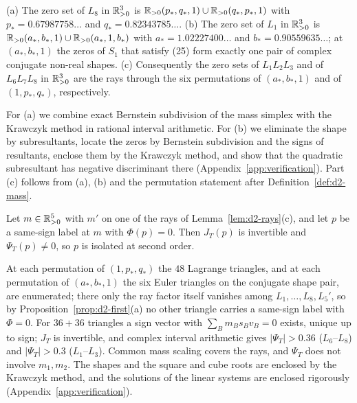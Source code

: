 \begin{lemma}\label{lem:d2-rays}
\textup{(a)} The zero set of $L_8$ in $\mathbb{R}_{>0}^3$ is $\mathbb{R}_{>0}(p_*,q_*,1)\cup\mathbb{R}_{>0}(q_*,p_*,1)$ with
$p_*=0.67987758\ldots$ and $q_*=0.82343785\ldots$.
\textup{(b)} The zero set of $L_1$ in $\mathbb{R}_{>0}^3$ is $\mathbb{R}_{>0}(a_*,b_*,1)\cup\mathbb{R}_{>0}(a_*,1,b_*)$ with
$a_*=1.02227400\ldots$ and $b_*=0.90559635\ldots$; at $(a_*,b_*,1)$ the zeros of $S_1$ that
satisfy \textup{(25)} form exactly one pair of complex conjugate non-real shapes.
\textup{(c)} Consequently the zero sets of $L_1L_2L_3$ and of $L_6L_7L_8$ in $\mathbb{R}_{>0}^3$ are the rays
through the six permutations of $(a_*,b_*,1)$ and of $(1,p_*,q_*)$, respectively.
\end{lemma}
For (a) we combine exact Bernstein subdivision of the mass simplex with the Krawczyk method in
rational interval arithmetic.  For (b) we eliminate the shape by subresultants, locate the zeros
by Bernstein subdivision and the signs of resultants, enclose them by the Krawczyk method, and
show that the quadratic subresultant has negative discriminant there
(Appendix~\ref{app:verification}).  Part (c) follows from (a), (b) and the permutation statement
after Definition~\ref{def:d2-mass}.

\begin{lemma}\label{lem:d2-Lray}
Let $m\in\mathbb{R}_{>0}^5$ with $m'$ on one of the rays of Lemma~\ref{lem:d2-rays}(c), and let $p$ be a
same-sign label at $m$ with $\Phi(p)=0$.  Then $J_T(p)$ is invertible and $\Psi_T(p)\ne0$, so $p$
is isolated at second order.
\end{lemma}

At each permutation of $(1,p_*,q_*)$ the $48$ Lagrange triangles, and at each permutation of
$(a_*,b_*,1)$ the six Euler triangles on the conjugate shape pair, are enumerated; there only the
ray factor itself vanishes among $L_1,\dots,L_8,L_5'$, so by Proposition~\ref{prop:d2-first}(a)
no other triangle carries a same-sign label with $\Phi=0$.  For $36+36$ triangles a sign vector
with $\sum_Bm_Bs_Bv_B=0$ exists, unique up to sign; $J_T$ is invertible, and complex interval
arithmetic gives $|\Psi_T|>0.36$ ($L_6$--$L_8$) and $|\Psi_T|>0.3$ ($L_1$--$L_3$).  Common mass
scaling covers the rays, and $\Psi_T$ does not involve $m_1,m_2$.
The shapes and the square and cube roots are enclosed by the Krawczyk method, and the solutions
of the linear systems are enclosed rigorously (Appendix~\ref{app:verification}).

